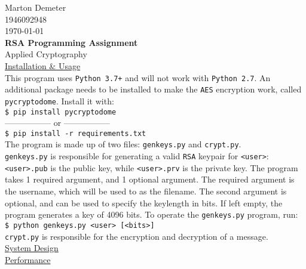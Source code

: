 \documentclass[letterpaper, 10pt]{article}
\begin{document}
  \flushright
  Marton Demeter\\
  1946092948\\
  \today\\

  \center
  \textbf{RSA Programming Assignment}\\
  Applied Cryptography\\

  \flushleft
  \underline{Installation \& Usage}\\
  This program uses \texttt{Python 3.7+} and will not work with \texttt{Python 2.7}. An additional package needs to be installed to make the \texttt{AES} encryption work, called \texttt{pycryptodome}. Install it with:\\[1em]
  \hspace{4mm}\texttt{\$ pip install pycryptodome}\\
  \hspace{4mm}----------------- or -----------------\\
  \hspace{4mm}\texttt{\$ pip install -r requirements.txt}\\[1em]
  The program is made up of two files: \texttt{genkeys.py} and \texttt{crypt.py}.\\[1em]
  \texttt{genkeys.py} is responsible for generating a valid \texttt{RSA} keypair for \texttt{<user>}: \texttt{<user>.pub} is the public key, while \texttt{<user>.prv} is the private key. The program takes 1 required argument, and 1 optional argument. The required argument is the username, which will be used to as the filename. The second argument is optional, and can be used to specify the keylength in bits. If left empty, the program generates a key of 4096 bits. To operate the \texttt{genkeys.py} program, run:\\[1em]
  \hspace{4mm}\texttt{\$ python genkeys.py <user> [<bits>]}\\[1em]
  \texttt{crypt.py} is responsible for the encryption and decryption of a message.
  \\[1em]
  \underline{System Design}\\

  \underline{Performance}\\
\end{document}
